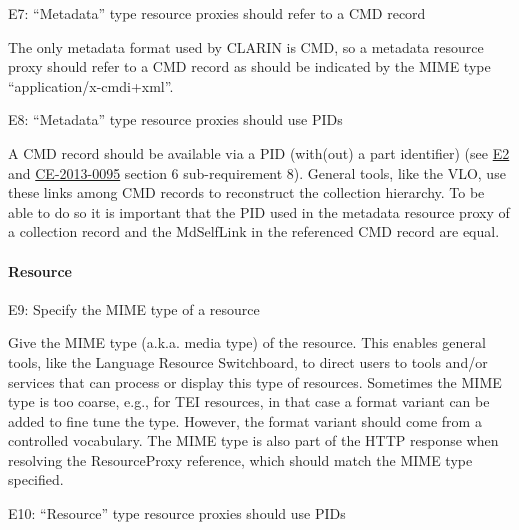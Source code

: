 E7: ``Metadata'' type resource proxies should refer to a CMD record

 

The only metadata format used by CLARIN is CMD, so a metadata resource proxy should refer to a CMD record as should be indicated by the MIME type ``application/x-cmdi+xml''.

\label{e8}
E8: ``Metadata'' type resource proxies should use PIDs


A CMD record should be available via a PID (with(out) a part identifier) (see \hyperref[e2]{E2} and \href{http://hdl.handle.net/1839/00-DOCS.CLARIN.EU-78}{CE-2013-0095} section 6 sub-requirement 8). General tools, like the VLO, use these links among CMD records to reconstruct the collection hierarchy. To be able to do so it is important that the PID used in the metadata resource proxy of a collection record and the MdSelfLink in the referenced CMD record are equal.

\paragraph{Resource}\label{resource}



E9: Specify the MIME type of a resource

 

Give the MIME type (a.k.a. media type) of the resource. This enables general tools, like the Language Resource Switchboard, to direct users to tools and/or services that can process or display this type of resources. Sometimes the MIME type is too coarse, e.g., for TEI resources, in that case a format variant can be added to fine tune the type. However, the format variant should come from a controlled vocabulary. The MIME type is also part of the HTTP response when resolving the ResourceProxy reference, which should match the MIME type specified.

E10: ``Resource'' type resource proxies should use PIDs


